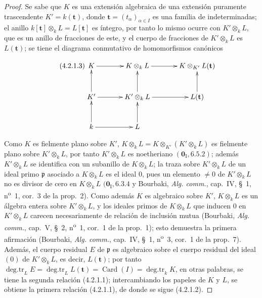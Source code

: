 \begin{proof}
Se sabe que $K$ es una extensión algebraica de una extensión puramente
trascendente $K'=k(\mathbf t)$, donde $\mathbf t=(t_\alpha)_{\alpha\in I}$ es
una familia de indeterminadas; el anillo $k[\mathbf t]\otimes_k L=L[\mathbf t]$
es íntegro, por tanto lo mismo ocurre con $K'\otimes_k L$, que es un anillo de
fracciones de este, y el cuerpo de fracciones de $K'\otimes_k L$ es
$L(\mathbf t)$; se tiene el diagrama conmutativo de homomorfismos canónicos


\begin{equation}
\tag{4.2.1.3}
\label{IV.2.4.2.1.3-fr}
\xymatrix@C=3.5em@R=2.8em{
K \ar[r] & K\otimes_k L \ar[r] & K\otimes_{K'}L(\mathbf t)\\
K' \ar[u] \ar[r] & K'\otimes_k L \ar[u] \ar[r] & L(\mathbf t) \ar[u]\\
k \ar[u] \ar[r] & L \ar[u] &
}
\end{equation}

Como $K$ es fielmente plano sobre $K'$, $K\otimes_k L
=K\otimes_{K'}(K'\otimes_k L)$ es fielmente plano sobre $K'\otimes_k L$,
por tanto $K'\otimes_k L$ es noetheriano $(\mathbf{0}_{\mathrm I},6.5.2)$; además
$K'\otimes_k L$ se identifica con un subanillo de $K\otimes_k L$; la traza
sobre $K'\otimes_k L$ de un ideal primo $\mathfrak p$ asociado a $K\otimes_k L$
es el ideal $0$, pues un elemento $\neq0$ de $K'\otimes_k L$ no es divisor de
cero en $K\otimes_k L$ $(\mathbf{0}_{\mathrm I},6.3.4$ y Bourbaki,
\emph{Alg. comm.}, cap.~IV, \S~1, n\textsuperscript{o}~1, cor.~3 de la
prop.~2). Como además $K$ es algebraico sobre $K'$, $K\otimes_k L$ es un
álgebra entera sobre $K'\otimes_k L$, y los ideales primos de $K\otimes_k L$
que inducen $0$ en $K'\otimes_k L$ carecen necesariamente de relación de
inclusión mutua (Bourbaki, \emph{Alg. comm.}, cap.~V, \S~2,
n\textsuperscript{o}~1, cor.~1 de la prop.~1); esto demuestra la primera
afirmación (Bourbaki, \emph{Alg. comm.}, cap.~IV, \S~1,
n\textsuperscript{o}~3, cor.~1 de la prop.~7). Además, el cuerpo residual $E$
de $\mathfrak p$ es algebraico sobre el cuerpo residual del ideal $(0)$ de
$K'\otimes_k L$, es decir, $L(\mathbf t)$; por tanto
$\operatorname{deg.tr}_L E=\operatorname{deg.tr}_L L(\mathbf t)
=\operatorname{Card}(I)=\operatorname{deg.tr}_k K$, en otras palabras, se
tiene la segunda relación (4.2.1.1); intercambiando los papeles de $K$ y $L$,
se obtiene la primera relación (4.2.1.1), de donde se sigue (4.2.1.2).
\end{proof}

